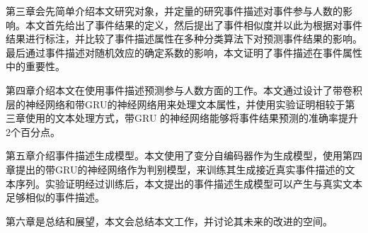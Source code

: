 第三章会先简单介绍本文研究对象，并定量的研究事件描述对事件参与人数的影响。本文首先给出了事件结果的定义，然后提出了事件相似度并以此为根据对事件结果进行标注，并比较了事件描述属性在多种分类算法下对预测事件结果的影响。最后通过事件描述对随机效应的确定系数的影响，本文证明了事件描述在事件属性中的重要性。

第四章介绍本文在使用事件描述预测参与人数方面的工作。本文通过设计了带卷积层的神经网络和带GRU的神经网络用来处理文本属性，并使用实验证明相较于第三章使用的文本处理方式，带GRU 的神经网络能够将事件结果预测的准确率提升2个百分点。

第五章介绍事件描述生成模型。本文使用了变分自编码器作为生成模型，使用第四章提出的带GRU的神经网络作为判别模型，来训练其生成接近真实事件描述的文本序列。实验证明经过训练后，本文提出的事件描述生成模型可以产生与真实文本足够相似的事件描述。

第六章是总结和展望，本文会总结本文工作，并讨论其未来的改进的空间。


%  

